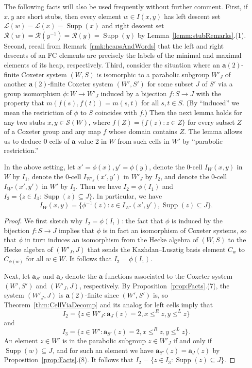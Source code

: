 \documentclass[ALCO,Unicode,published]{cedram}
\newcommand{\call}{\mathcal{L}}
\newcommand{\calr}{\mathcal{R}}
\newcommand{\la}{\mathbf{a}}
\newcommand{\sw}{\mathcal{S}(W)}
\newcommand{\ra}{\rightarrow}
\newcommand{\se}{\subseteq}
\newcommand{\inverse}{^{-1}}
\DeclareMathOperator{\supp}{\mathrm{Supp}}
\begin{document}
The following facts will also be used frequently without further comment. First, if $x,y$ are short
stubs, then every element $w\in I(x,y)$ has left descent set $\call(w)=\call(x)=\supp(x)$ and right
descent set $\calr(w)=\calr(y\inverse)=\calr(y)=\supp(y)$ by Lemma~\ref{lemm:stubRemarks}.(1).  Second,
recall from Remark~\ref{rmk:heapsAndWords} that the left and right descents of an FC elements are
precisely the labels of the minimal and maximal elements of its heap, respectively.  Third, consider
the situation where an $\la(2)$-finite Coxeter system $(W,S)$ is isomorphic to a parabolic subgroup
$W'_J$ of another $\la(2)$-finite Coxeter system $(W',S')$ for some subset $J$ of $S'$ via a group
isomorphism $\phi:W\ra W'_J$ induced by a bijection $f: S\ra J$ with the property that
$m(f(s),f(t))=m(s,t)$ for all $s,t\in S$.  (By ``induced'' we mean the restriction of $\phi$ to $S$
coincides with $f$.) Then the next lemma holds for any two stubs $x,y\in \sw$, where
$f(Z)=\{f(z):z\in Z\}$ for every subset $Z$ of a Coxeter group and any map $f$ whose domain contains
$Z$. The lemma allows us to deduce 0-cells of $\la$-value 2 in $W$ from such cells in $W'$ by
``parabolic restriction.''

\begin{lemma}
    \label{lemm:parabolic}
    In the above setting, let $x'=\phi(x),y'=\phi(y)$, denote the 0-cell $I_W(x,y)$ in $W$ by $I_1$,
    denote the 0-cell $I_{W'_J}(x',y')$ in $W'_J$ by $I_{2}$, and denote the 0-cell $I_{W'}(x',y')$
    in $W'$ by $I_3$.  Then we have $I_2=\phi(I_1)$ and $I_2=\{z\in I_3: \supp(z)\se J\}$. In
    particular, we have 
    \begin{equation*} I_W(x,y)=\{\phi\inverse(z):z\in I_{W'}(x',y'), \supp(z)\se J\}.
      \label{eq:parabolic}
    \end{equation*}
\end{lemma}

\begin{proof}
  We first sketch why $I_2=\phi(I_1)$: the fact that $\phi$ is induced by the bijection $f: S\ra J$
  implies that $\phi$ is in fact an {isomorphism of Coxeter systems}, so that $\phi$ in turn induces
  an isomorphism from the Hecke algebra of $(W,S)$ to the Hecke algebra of $(W'_J,J)$ that sends the
  Kazhdan--Lusztig basis element $C_{w}$ to $C_{\phi(w)}$ for all $w\in W$. It follows that
  $I_2=\phi(I_1)$. 

  Next, let $\la_{S'}$ and $\la_{J}$ denote the $\la$-functions associated to the Coxeter system $(W',S')$ and
  $(W'_J, J)$, respectively. By Proposition~\ref{prop:Facts}.(7), the system $(W'_J,J)$ is $\la(2)$-finite since $(W',S')$ is,
  so Theorem~\ref{thm:CellViaDecomp} and its analog for left cells imply that
  \[
    I_2=\{z\in W'_J: \la_J(z)=2, x\le^R z, y\le^L z\}  
  \]
  and
  \[
    I_3=\{z\in W': \la_{S'}(z)=2, x\le^R z, y\le^L z\}.
  \]
  An element $z\in W'$ is in the parabolic subgroup $z\in W'_J$ if and only if $\supp(w)\se J$, and for such an
  element we have $\la_{S'}(z)=\la_J(z)$ by Proposition~\ref{prop:Facts}.(8). It follows that $I_2=\{z\in I_3:\supp(z)\se
  J\}$. 
\end{proof}
\end{document}
